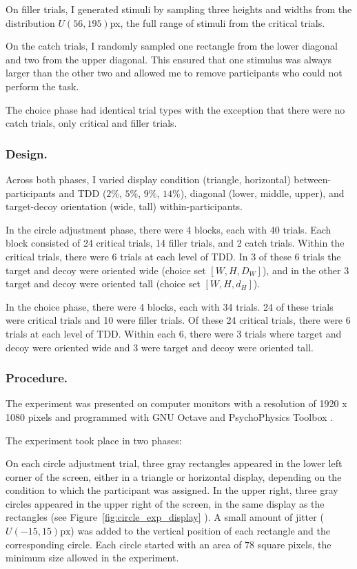 On filler trials, I generated stimuli by sampling three heights and widths from the distribution $U(56,195)$px, the full range of stimuli from the critical trials.

On the catch trials, I randomly sampled one rectangle from the lower diagonal and two from the upper diagonal. This ensured that one stimulus was always larger than the other two and allowed me to remove participants who could not perform the task.

The choice phase had identical trial types with the exception that there were no catch trials, only critical and filler trials.

\subsubsection{Design.}
Across both phases, I varied display condition (triangle, horizontal) between-participants and TDD ($2\%$, $5\%$, $9\%$, $14\%$), diagonal (lower, middle, upper), and target-decoy orientation (wide, tall) within-participants. 

In the circle adjustment phase, there were 4 blocks, each with 40 trials. Each block consisted of 24 critical trials, 14 filler trials, and 2 catch trials. Within the critical trials, there were 6 trials at each level of TDD. In 3 of these 6 trials the target and decoy were oriented wide (choice set $[W,H,D_{W}]$), and in the other 3 target and decoy were oriented tall (choice set $[W,H,d_{H}]$). 

In the choice phase, there were 4 blocks, each with 34 trials. 24 of these trials were critical trials and 10 were filler trials. Of these 24 critical trials, there were 6 trials at each level of TDD. Within each 6, there were 3 trials where target and decoy were oriented wide and 3 were target and decoy were oriented tall. 

\subsubsection{Procedure.}

The experiment was presented on computer monitors with a resolution of 1920 x 1080 pixels and programmed with GNU Octave \parencite{octave} and PsychoPhysics Toolbox \parencite{brainardPsychophysicsToolbox1997}. 

The experiment took place in two phases: 

On each circle adjustment trial, three gray rectangles appeared in the lower left corner of the screen, either in a triangle or horizontal display, depending on the condition to which the participant was assigned. In the upper right, three gray circles appeared in the upper right of the screen, in the same display as the rectangles (see Figure~\ref{fig:circle_exp_display} ). A small amount of jitter ($U(-15,15)\text{px}$) was added to the vertical position of each rectangle and the corresponding circle. Each circle started with an area of $78$ square pixels, the minimum size allowed in the experiment. 

